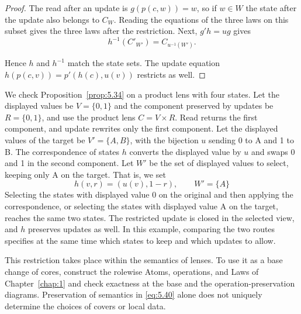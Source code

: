 \begin{proof}

The read after an update is $g(p(c,w))=w$, so if $w\in W$ the state after the update also
belongs to $C_W$. Reading the equations of the three laws on this subset gives the three
laws after the restriction. Next, $g'h=ug$ gives
\begin{equation*}
h^{-1}(C'_{W'})=C_{u^{-1}(W')}.
\tag{5.41}\label{eq:5.41}
\end{equation*}

Hence $h$ and $h^{-1}$ match the state sets.
The update equation $h(p(c,v))=p'(h(c),u(v))$ restricts as well.

\end{proof}

\begin{example}\label{ex:5.35}

We check Proposition~\ref{prop:5.34} on a product lens with four states. Let the displayed values be $V=\{0,1\}$ and the component preserved by
updates be $R=\{0,1\}$, and use the product lens $C=V\times R$. Read returns the first
component, and update rewrites only the first component. Let the displayed values of the
target be $V'=\{A,B\}$, with the bijection $u$ sending 0 to A and 1 to B. The
correspondence of states $h$ converts the displayed value by $u$ and swaps 0 and 1 in the
second component. Let $W'$ be the set of displayed values to select, keeping only A on the
target. That is, we set
\begin{equation*}
h(v,r)=(u(v),1-r),\qquad W'=\{A\}
\tag{5.42}\label{eq:5.42}
\end{equation*}
Selecting the states with displayed value 0 on the original and then applying the
correspondence, or selecting the states with displayed value A on the target, reaches the
same two states. The restricted update is closed in the selected view, and $h$ preserves
updates as well. In this example, comparing the two routes specifies at the same time
which states to keep and which updates to allow.

\end{example}

This restriction takes place within the semantics of lenses.
To use it as a base change of cores, construct the rolewise Atoms, operations, and Laws
of Chapter~\ref{chap:1} and check exactness at the base and the operation-preservation
diagrams. Preservation of semantics in \eqref{eq:5.40} alone does not uniquely
determine the choices of covers or local data.

